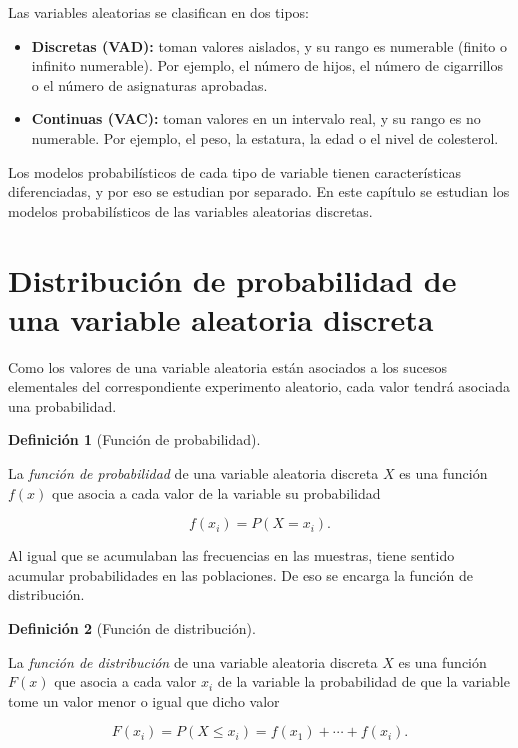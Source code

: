 \documentclass[
  spanish,
  a4paper,
]{scrreport}
\providecommand{\tightlist}{%
  \setlength{\itemsep}{0pt}\setlength{\parskip}{0pt}}
\theoremstyle{plain}
\theoremstyle{definition}
\theoremstyle{definition}
\newtheorem{definition}{Definición}[chapter]
\theoremstyle{remark}
\begin{document}
Las variables aleatorias se clasifican en dos tipos:

\begin{itemize}
\tightlist
\item
  \textbf{Discretas (VAD):} toman valores aislados, y su rango es
  numerable (finito o infinito numerable). Por ejemplo, el número de
  hijos, el número de cigarrillos o el número de asignaturas aprobadas.
\item
  \textbf{Continuas (VAC):} toman valores en un intervalo real, y su
  rango es no numerable. Por ejemplo, el peso, la estatura, la edad o el
  nivel de colesterol.
\end{itemize}

Los modelos probabilísticos de cada tipo de variable tienen
características diferenciadas, y por eso se estudian por separado. En
este capítulo se estudian los modelos probabilísticos de las variables
aleatorias discretas.

\section{Distribución de probabilidad de una variable aleatoria
discreta}\label{distribuciuxf3n-de-probabilidad-de-una-variable-aleatoria-discreta}

Como los valores de una variable aleatoria están asociados a los sucesos
elementales del correspondiente experimento aleatorio, cada valor tendrá
asociada una probabilidad.

\begin{definition}[Función de
probabilidad]\protect\hypertarget{def-funcion-probabilidad-discreta}{}\label{def-funcion-probabilidad-discreta}

La \emph{función de probabilidad} de una variable aleatoria discreta
\(X\) es una función \(f(x)\) que asocia a cada valor de la variable su
probabilidad

\[
f(x_i) = P(X=x_i).
\]

\end{definition}

Al igual que se acumulaban las frecuencias en las muestras, tiene
sentido acumular probabilidades en las poblaciones. De eso se encarga la
función de distribución.

\begin{definition}[Función de
distribución]\protect\hypertarget{def-funcion-distribucion-discreta}{}\label{def-funcion-distribucion-discreta}

La \emph{función de distribución} de una variable aleatoria discreta
\(X\) es una función \(F(x)\) que asocia a cada valor \(x_i\) de la
variable la probabilidad de que la variable tome un valor menor o igual
que dicho valor

\[
F(x_i) = P(X\leq x_i) = f(x_1)+\cdots +f(x_i).
\]

\end{definition}
\end{document}
